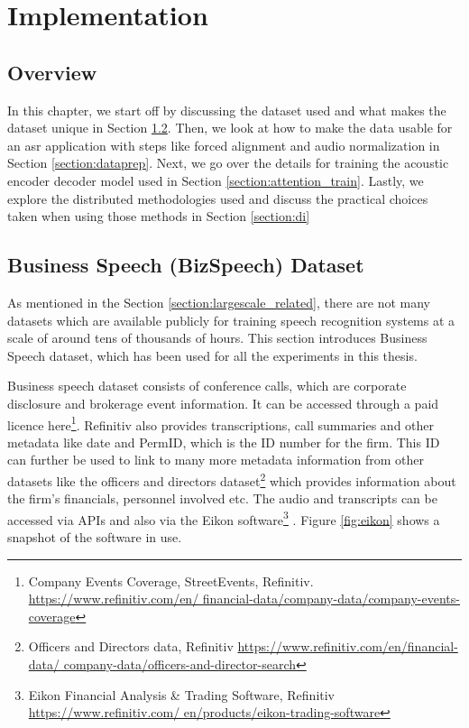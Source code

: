 \chapter{Implementation}
\label{chapter:methods}

\section{Overview}
In this chapter, we start off by discussing the dataset used and what makes the dataset unique in Section \ref{section:bizspeech}. Then, we look at how to make the data usable for an \acrshort{asr} application with steps like forced alignment and audio normalization in Section \ref{section:dataprep}. Next, we go over the details for training the acoustic encoder decoder model used in Section \ref{section:attention_train}. Lastly, we explore the distributed methodologies used and discuss the practical choices taken when using those methods in Section \ref{section:di}



\section{Business Speech (BizSpeech) Dataset}
\label{section:bizspeech}
As mentioned in the Section \ref{section:largescale_related}, there are not many datasets which are available publicly for training speech recognition systems at a scale of around tens of thousands of hours. This section introduces Business Speech dataset, which has been used for all the experiments in this thesis. 

Business speech dataset consists of conference calls, which are corporate disclosure and brokerage event information. It can be accessed through a paid licence here\footnote{Company Events Coverage, StreetEvents, Refinitiv. \href{https://www.refinitiv.com/en/financial-data/company-data/company-events-coverage}{https://www.refinitiv.com/en/ financial-data/company-data/company-events-coverage}}. Refinitiv also provides transcriptions, call summaries and other metadata like date and PermID, which is the ID number for the firm. This ID can further be used to link to many more metadata information from other datasets like the officers and directors dataset\footnote{Officers and Directors data, Refinitiv \href{https://www.refinitiv.com/en/financial-data/company-data/officers-and-director-search}{https://www.refinitiv.com/en/financial-data/ company-data/officers-and-director-search}} which provides information about the firm's financials, personnel involved etc. The audio and transcripts can be accessed via APIs and also via the Eikon software\footnote{Eikon Financial Analysis \& Trading Software, Refinitiv \href{https://www.refinitiv.com/en/products/eikon-trading-software}{https://www.refinitiv.com/ en/products/eikon-trading-software}} \cite{August2011ThomsonEikon}. Figure \ref{fig:eikon} shows a snapshot of the software in use.


